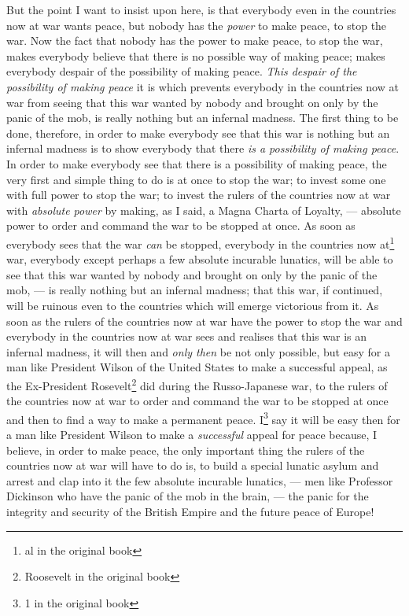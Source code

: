 But the point I want to insist upon here, is that everybody even in the countries now at war wants peace, but nobody has the \emph{power} to make peace, to stop the war.
Now the fact that nobody has the power to make peace, to stop the war, makes everybody believe that there is no possible way of making peace; makes everybody despair of the possibility of making peace.
\emph{This despair of the possibility of making peace} it is which prevents everybody in the countries now at war from seeing that this war wanted by nobody and brought on only by the panic of the mob, is really nothing but an infernal madness.
The first thing to be done, therefore, in order to make everybody see that this war is nothing but an infernal madness is to show everybody that there \emph{is a possibility of making peace}.
In order to make everybody see that there is a possibility of making peace, the very first and simple thing to do is at once to stop the war; to invest some one with full power to stop the war; to invest the rulers of the countries now at war with \emph{absolute power} by making, as I said, a Magna Charta of Loyalty, --- absolute power to order and command the war to be stopped at once.
As soon as everybody sees that the war \emph{can} be stopped, everybody in the countries now at\footnote{al in the original book} war, everybody except perhaps a few absolute incurable lunatics, will be able to see that this war wanted by nobody and brought on only by the panic of the mob, --- is really nothing but an infernal madness; that this war, if continued, will be ruinous even to the countries which will emerge victorious from it.
As soon as the rulers of the countries now at war have the power to stop the war and everybody in the countries now at war sees and realises that this war is an infernal madness, it will then and \emph{only then} be not only possible, but easy for a man like President Wilson of the United States to make a successful appeal, as the Ex-President Rosevelt\footnote{Roosevelt in the original book} did during the Russo-Japanese war, to the rulers of the countries now at war to order and command the war to be stopped at once and then to find a way to make a permanent peace.
I\footnote{1 in the original book} say it will be easy then for a man like President Wilson to make a \emph{successful} appeal for peace because, I believe, in order to make peace, the only important thing the rulers of the countries now at war will have to do is, to build a special lunatic asylum and arrest and clap into it the few absolute incurable lunatics, --- men like Professor Dickinson who have the panic of the mob in the brain, --- the panic for the integrity and security of the British Empire and the future peace of Europe!

